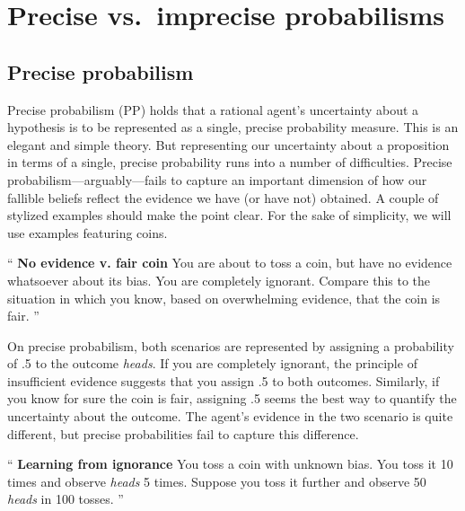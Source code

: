 \documentclass[
  10pt,
  dvipsnames,enabledeprecatedfontcommands]{scrartcl}
\renewenvironment{quote}
{\list{}{\leftmargin=1em\rightmargin=1em}\item[]``}
{''\endlist}
\begin{document}

\section{Precise vs.~imprecise
probabilisms}\label{precise-vs.-imprecise-probabilisms}

\label{sec:three-probabilism}

\subsection{Precise probabilism}\label{precise-probabilism}

Precise probabilism (\textsf{PP}) holds that a rational agent's
uncertainty about a hypothesis is to be represented as a single, precise
probability measure. This is an elegant and simple theory. But
representing our uncertainty about a proposition in terms of a single,
precise probability runs into a number of difficulties. Precise
probabilism---arguably---fails to capture an important dimension of how
our fallible beliefs reflect the evidence we have (or have not)
obtained. A couple of stylized examples should make the point clear. For
the sake of simplicity, we will use examples featuring coins.

\begin{quote}
\textbf{No evidence v. fair coin}
You are about to toss a coin, but have no evidence 
whatsoever about its bias. You are completely ignorant. 
Compare this to the situation in which you know, 
based on overwhelming evidence, that the coin is fair. 
\end{quote}

\noindent On precise probabilism, both scenarios are represented by
assigning a probability of .5 to the outcome \emph{heads}. If you are
completely ignorant, the principle of insufficient evidence suggests
that you assign .5 to both outcomes. Similarly, if you know for sure the
coin is fair, assigning .5 seems the best way to quantify the
uncertainty about the outcome. The agent's evidence in the two scenario
is quite different, but precise probabilities fail to capture this
difference.

\begin{quote}
\textbf{Learning from ignorance}
You toss a coin with unknown bias. You toss it 10 times and observe \emph{heads} 5 times. Suppose you toss it further and observe 50 \emph{heads} in 100 tosses. 
\end{quote}
\end{document}

